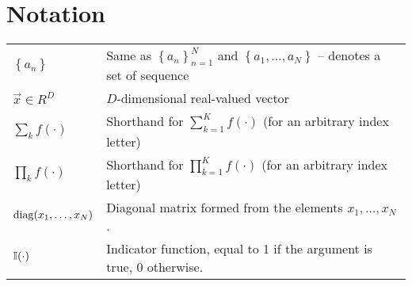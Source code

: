 \chapter{Notation}
\begin{tabular}{ll}
    $\left\{a_n\right\}$                & Same as $\left\{a_n\right\}_{n = 1}^N$ and $\left\{a_1, \dotsc, a_N\right\}$ -- denotes a set of sequence \\
    $\vec x \in R^D$                    & $D$-dimensional real-valued vector \\
    $\sum_k f(\cdot)$                   & Shorthand for $\sum_{k = 1}^K f(\cdot)$ (for an arbitrary index letter) \\
    $\prod_k f(\cdot)$                  & Shorthand for $\prod_{k = 1}^K f(\cdot)$ (for an arbitrary index letter) \\
    $\operatorname{diag}(x_1, \dotsc, x_N)$           & Diagonal matrix formed from the elements $x_1, \dotsc, x_N$. \\
    $\operatorname{\mathbb I}(\cdot)$							& Indicator function, equal to 1 if the argument is true, 0 otherwise.
\end{tabular}